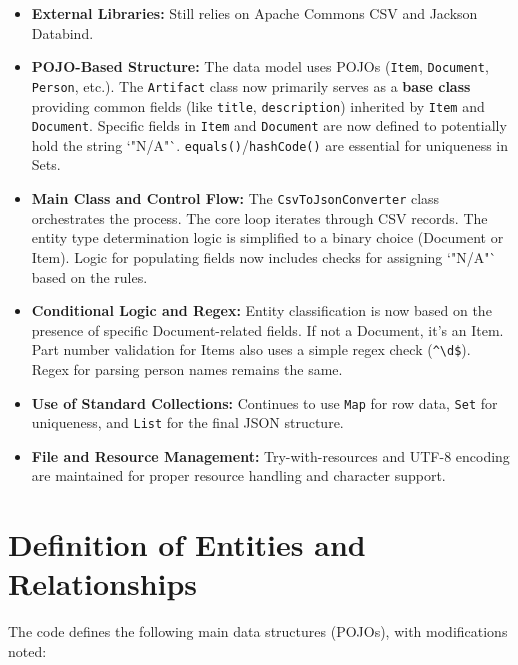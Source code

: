 \documentclass[11pt, a4paper]{article}
\begin{document}
\begin{itemize}
    \item \textbf{External Libraries:} Still relies on Apache Commons CSV and Jackson Databind.

    \item \textbf{POJO-Based Structure:} The data model uses POJOs (\texttt{Item}, \texttt{Document}, \texttt{Person}, etc.). The \texttt{Artifact} class now primarily serves as a \textbf{base class} providing common fields (like \texttt{title}, \texttt{description}) inherited by \texttt{Item} and \texttt{Document}. Specific fields in \texttt{Item} and \texttt{Document} are now defined to potentially hold the string `"N/A"`. \texttt{equals()}/\texttt{hashCode()} are essential for uniqueness in Sets.

    \item \textbf{Main Class and Control Flow:} The \texttt{CsvToJsonConverter} class orchestrates the process. The core loop iterates through CSV records. The entity type determination logic is simplified to a binary choice (Document or Item). Logic for populating fields now includes checks for assigning `"N/A"` based on the rules.

    \item \textbf{Conditional Logic and Regex:} Entity classification is now based on the presence of specific Document-related fields. If not a Document, it's an Item. Part number validation for Items also uses a simple regex check (\texttt{\^{}\textbackslash{}d\$}). Regex for parsing person names remains the same.

    \item \textbf{Use of Standard Collections:} Continues to use \texttt{Map} for row data, \texttt{Set} for uniqueness, and \texttt{List} for the final JSON structure.

    \item \textbf{File and Resource Management:} Try-with-resources and UTF-8 encoding are maintained for proper resource handling and character support.
\end{itemize}

\section{Definition of Entities and Relationships}
The code defines the following main data structures (POJOs), with modifications noted:
\end{document}
